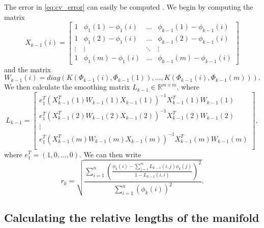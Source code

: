 \documentclass[preprint]{elsarticle}
\begin{document}
The error in \eqref{eq:cv_error} can easily be computed \cite{wasserman2006all}.
%
We begin by computing the matrix
\begin{equation}
X_{k-1}(i) = \begin{bmatrix}
1 & \phi_1(1) - \phi_1(i) & \dots & \phi_{k-1}(1)- \phi_{k-1}(i) \\
1 & \phi_1(2) - \phi_1(i) & \dots & \phi_{k-1}(2)- \phi_{k-1}(i) \\
\vdots & \vdots & \ddots & \vdots \\
1 & \phi_1(m) - \phi_1(i) & \dots & \phi_{k-1}(m)- \phi_{k-1}(i) 
\end{bmatrix}
\end{equation}
%
and the matrix 
\begin{equation}
W_{k-1}(i) = diag \left( K(\Phi_{k-1}(i), \Phi_{k-1}(1)), \dots, K(\Phi_{k-1}(i), \Phi_{k-1}(m)) \right).
\end{equation}
%
We then calculate the smoothing matrix $L_{k-1} \in \mathbb{R}^{m \times m}$, where 
\begin{equation}
L_{k-1} =
\begin{bmatrix}
e_1^T \left( X_{k-1}^T(1) W_{k-1}(1) X_{k-1}(1) \right) ^{-1} X_{k-1}^T(1) W_{k-1}(1) \\
e_1^T \left( X_{k-1}^T(2) W_{k-1}(2) X_{k-1}(2) \right) ^{-1} X_{k-1}^T(2) W_{k-1}(2) \\
\vdots \\
e_1^T \left( X_{k-1}^T(m) W_{k-1}(m) X_{k-1}(m) \right) ^{-1} X_{k-1}^T(m) W_{k-1}(m) \\
\end{bmatrix},
\end{equation}
%
where $e_1^T = (1, 0, \dots, 0)$. 
%
We can then write
%
\begin{equation} 
r_{k} = \sqrt{ \frac{\sum_{i=1}^n \left( \frac{ \phi_{k} (i) - \sum_{j=1}^m L_{k-1}(i,j) \phi_{k}(j) }{1-L_{k-1}(i,i)} \right)^2} {\sum_{i=1}^n  \left( \phi_{k} (i) \right)^2 }} .
\end{equation}

\subsection{Calculating the relative lengths of the manifold} \label{sec:relative_lengths}
\end{document}
